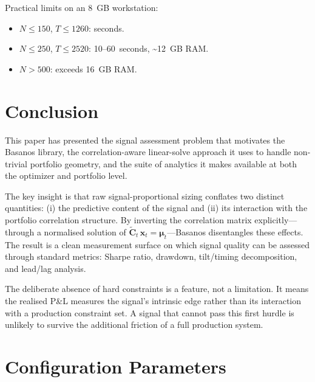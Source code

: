 \documentclass[11pt,a4paper]{article}
\newcommand{\C}{\mathbf{C}}
\newcommand{\x}{\mathbf{x}}
\newcommand{\muvec}{\bm{\mu}}
\begin{document}
Practical limits on an 8~GB workstation:
\begin{itemize}
  \item $N \leq 150$, $T \leq 1260$: seconds.
  \item $N \leq 250$, $T \leq 2520$: 10--60~seconds, \textasciitilde12~GB RAM.
  \item $N > 500$: exceeds 16~GB RAM.
\end{itemize}

\section{Conclusion}
\label{sec:conclusion}

This paper has presented the signal assessment problem that motivates the
Basanos library, the correlation-aware linear-solve approach it uses to
handle non-trivial portfolio geometry, and the suite of analytics it makes
available at both the optimizer and portfolio level.

The key insight is that raw signal-proportional sizing conflates two
distinct quantities: (i) the predictive content of the signal and (ii) its
interaction with the portfolio correlation structure.  By inverting the
correlation matrix explicitly---through a normalised solution of
$\tilde{\C}_t\,\x_t = \muvec_t$---Basanos disentangles these effects.
The result is a clean measurement surface on which signal quality can be
assessed through standard metrics: Sharpe ratio, drawdown, tilt/timing
decomposition, and lead/lag analysis.

The deliberate absence of hard constraints is a feature, not a
limitation.  It means the realised P\&L measures the signal's intrinsic
edge rather than its interaction with a production constraint set.  A signal
that cannot pass this first hurdle is unlikely to survive the additional
friction of a full production system.

\appendix

\section{Configuration Parameters}
\label{app:config}
\end{document}
